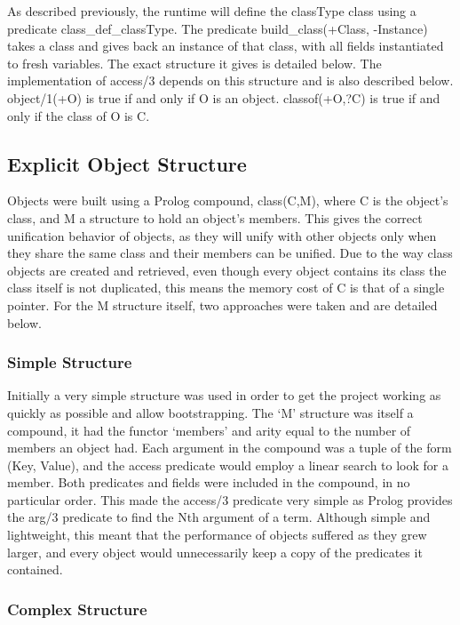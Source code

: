 \documentclass[12pt,a4paper,twoside,openright]{report}
\begin{document}
As described previously, the runtime will define the classType class using a predicate class_def_classType. The predicate build_class(+Class, -Instance) takes a class and gives back an instance of that class, with all fields instantiated to fresh variables. The exact structure it gives is detailed below. The implementation of access/3 depends on this structure and is also described below. object/1(+O) is true if and only if O is an object. classof(+O,?C) is true if and only if the class of O is C.

	\subsection{Explicit Object Structure}
	
Objects were built using a Prolog compound, class(C,M), where C is the object's class, and M a structure to hold an object's members. This gives the correct unification behavior of objects, as they will unify with other objects only when they share the same class and their members can be unified. Due to the way class objects are created and retrieved, even though every object contains its class the class itself is not duplicated, this means the memory cost of C is that of a single pointer. For the M structure itself, two approaches were taken and are detailed below.
	
		\subsubsection{Simple Structure}
		
Initially a very simple structure was used in order to get the project working as quickly as possible and allow bootstrapping. The `M' structure was itself a compound, it had the functor `members' and arity equal to the number of members an object had. Each argument in the compound was a tuple of the form (Key, Value), and the access predicate would employ a linear search to look for a member. Both predicates and fields were included in the compound, in no particular order. This made the access/3 predicate very simple as Prolog provides the arg/3 predicate to find the Nth argument of a term. Although simple and lightweight, this meant that the performance of objects suffered as they grew larger, and every object would unnecessarily keep a copy of the predicates it contained.

		\subsubsection{Complex Structure}
		
\end{document}

